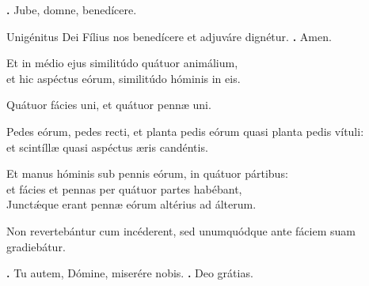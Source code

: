 \begin{small}
\textbf{\Vbar.} Jube, domne, benedícere.

Unigénitus Dei Fílius nos benedícere et adjuváre dignétur. 
\textbf{\Rbar.} Amen.
\end{small}


Et in médio ejus similitúdo quátuor animálium, \\
et hic aspéctus eórum, similitúdo hóminis in eis.

Quátuor fácies uni, et quátuor pennæ uni.

Pedes eórum, pedes recti, et planta pedis eórum quasi planta pedis vítuli: \\
et scintíllæ quasi aspéctus æris candéntis.

Et manus hóminis sub pennis eórum, in quátuor pártibus: \\
et fácies et pennas per quátuor partes habébant,\\
Junctǽque erant pennæ eórum altérius ad álterum. 

Non revertebántur cum incéderent, sed unumquódque ante fáciem suam gradiebátur.

\textbf{\Vbar.} Tu autem, Dómine, miserére nobis.
\textbf{\Rbar.} Deo grátias.

